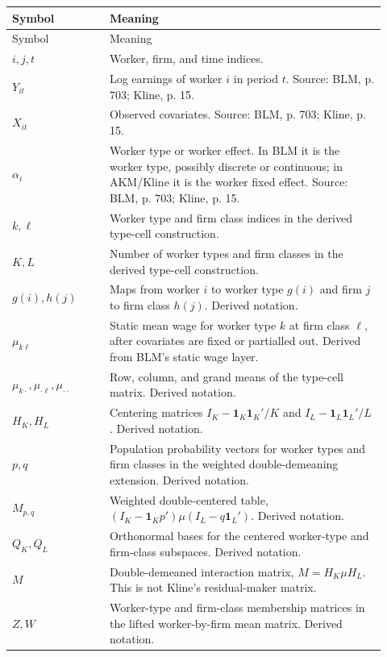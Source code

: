 \documentclass[11pt]{article}
\newcommand{\one}{\mathbf{1}}
\begin{document}
\begin{longtable}{>{\raggedright\arraybackslash}p{0.24\linewidth}
                  >{\raggedright\arraybackslash}p{0.68\linewidth}}
\toprule
Symbol & Meaning \\
\midrule
\endfirsthead
\toprule
Symbol & Meaning \\
\midrule
\endhead
\(i,j,t\) & Worker, firm, and time indices. \\
\(Y_{it}\) & Log earnings of worker \(i\) in period \(t\). Source: BLM, p. 703; Kline, p. 15. \\
\(X_{it}\) & Observed covariates. Source: BLM, p. 703; Kline, p. 15. \\
\(\alpha_i\) & Worker type or worker effect. In BLM it is the worker type, possibly discrete or continuous; in AKM/Kline it is the worker fixed effect. Source: BLM, p. 703; Kline, p. 15. \\
\(k,\ell\) & Worker type and firm class indices in the derived type-cell construction. \\
\(K,L\) & Number of worker types and firm classes in the derived type-cell construction. \\
\(g(i),h(j)\) & Maps from worker \(i\) to worker type \(g(i)\) and firm \(j\) to firm class \(h(j)\). Derived notation. \\
\(\mu_{k\ell}\) & Static mean wage for worker type \(k\) at firm class \(\ell\), after covariates are fixed or partialled out. Derived from BLM's static wage layer. \\
\(\mu_{k\cdot},\mu_{\cdot\ell},\mu_{\cdot\cdot}\) & Row, column, and grand means of the type-cell matrix. Derived notation. \\
\(H_K,H_L\) & Centering matrices \(I_K-\one_K\one_K'/K\) and \(I_L-\one_L\one_L'/L\). Derived notation. \\
\(p,q\) & Population probability vectors for worker types and firm classes in the weighted double-demeaning extension. Derived notation. \\
\(M_{p,q}\) & Weighted double-centered table, \((I_K-\one_Kp')\mu(I_L-q\one_L')\). Derived notation. \\
\(Q_K,Q_L\) & Orthonormal bases for the centered worker-type and firm-class subspaces. Derived notation. \\
\(M\) & Double-demeaned interaction matrix, \(M=H_K\mu H_L\). This is not Kline's residual-maker matrix. \\
\(Z,W\) & Worker-type and firm-class membership matrices in the lifted worker-by-firm mean matrix. Derived notation. \\

\end{longtable}
\end{document}
